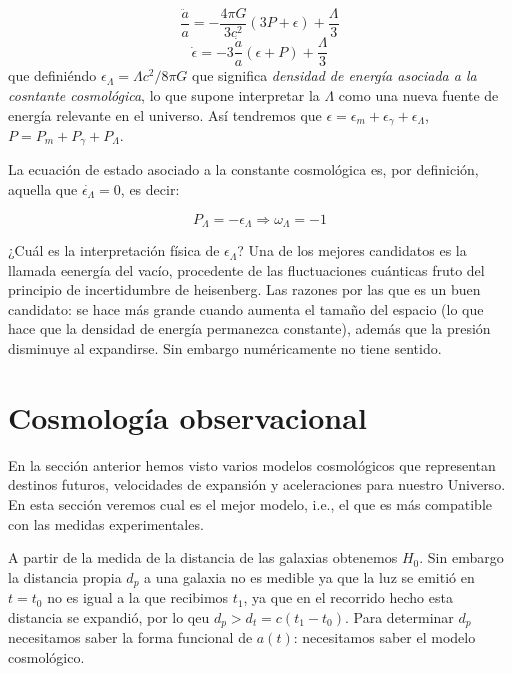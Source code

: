 \begin{equation}
	\frac{\ddot{a}}{a} = - \frac{4 \pi G}{3c^2} (3P + \epsilon) + \frac{\Lambda}{3}
\end{equation}
\begin{equation}
	\dot{\epsilon} = - 3 \frac{\dot{a}}{a} (\epsilon + P) + \frac{\Lambda}{3}
\end{equation}
que definiéndo $\epsilon_\Lambda = \Lambda c^2 / 8 \pi G$  que significa \textit{densidad de energía asociada a la cosntante cosmológica}, lo que supone interpretar la $\Lambda$ como una nueva fuente de energía relevante en el universo. Así tendremos que $\epsilon=\epsilon_m + \epsilon_\gamma + \epsilon_\Lambda$, $P=P_m + P_\gamma + P_\Lambda$.


La ecuación de estado asociado a la constante cosmológica es, por definición, aquella que $\dot{\epsilon_\Lambda}=0$, es decir:

\begin{equation}
	P_\Lambda = - \epsilon_\Lambda \Rightarrow \omega_\Lambda = -1
\end{equation}

¿Cuál es la interpretación física de $\epsilon_\Lambda$? Una de los mejores candidatos es la llamada eenergía del vacío, procedente de las fluctuaciones cuánticas fruto del principio de incertidumbre de heisenberg. Las razones por las que es un buen candidato: se hace más grande cuando aumenta el tamaño del espacio (lo que hace que la densidad de energía permanezca constante), además que la presión disminuye al expandirse. Sin embargo numéricamente no tiene sentido.


\section{Cosmología observacional}

En la sección anterior hemos visto varios modelos cosmológicos que representan destinos futuros, velocidades de expansión y aceleraciones para nuestro Universo. En esta sección veremos cual es el mejor modelo, i.e., el que es más compatible con las medidas experimentales.

A partir de la medida de la distancia de las galaxias obtenemos $H_0$. Sin embargo la distancia propia $d_p$ a una galaxia no es medible ya que la luz se emitió en $t=t_0$ no es igual a la que recibimos $t_1$, ya que en el recorrido hecho esta distancia se expandió, por lo qeu $d_p>d_t=c(t_1-t_0)$. Para determinar $d_p$ necesitamos saber la forma funcional de $a(t)$: necesitamos saber el modelo cosmológico.

